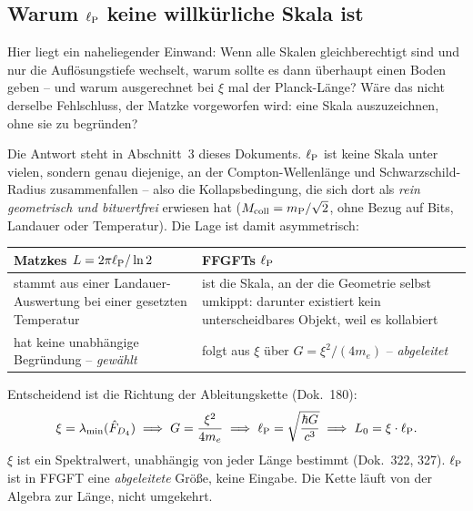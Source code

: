 \subsection{Warum $\ell_{\mathrm{P}}$ keine willkürliche Skala ist}

Hier liegt ein naheliegender Einwand: Wenn alle Skalen gleichberechtigt
sind und nur die Auflösungstiefe wechselt, warum sollte es dann überhaupt
einen Boden geben -- und warum ausgerechnet bei $\xi$ mal der
Planck-Länge? Wäre das nicht derselbe Fehlschluss, der Matzke
vorgeworfen wird: eine Skala auszuzeichnen, ohne sie zu begründen?

Die Antwort steht in Abschnitt~3 dieses Dokuments. $\ell_{\mathrm{P}}$ ist keine Skala
unter vielen, sondern genau diejenige, an der Compton-Wellenlänge und
Schwarzschild-Radius zusammenfallen -- also die Kollapsbedingung, die
sich dort als \emph{rein geometrisch und bitwertfrei} erwiesen hat
($M_{\mathrm{coll}} = m_{\mathrm{P}}/\sqrt{2}$, ohne Bezug auf Bits, Landauer oder Temperatur).
Die Lage ist damit asymmetrisch:

\begin{center}
\small
\begin{tabular}{@{}p{5.2cm}p{8.3cm}@{}}
  \toprule
  \textbf{Matzkes} $L = 2\pi\ell_{\mathrm{P}}/\ln 2$ & \textbf{FFGFTs} $\ell_{\mathrm{P}}$ \\
  \midrule
  stammt aus einer Landauer-Auswertung bei einer gesetzten Temperatur &
  ist die Skala, an der die Geometrie selbst umkippt: darunter existiert
  kein unterscheidbares Objekt, weil es kollabiert \\[3pt]
  hat keine unabhängige Begründung -- \emph{gewählt} &
  folgt aus $\xi$ über $G = \xi^2/(4m_e)$ -- \emph{abgeleitet} \\
  \bottomrule
\end{tabular}
\end{center}

Entscheidend ist die Richtung der Ableitungskette (Dok.~180):
\begin{equation}
  \xi = \lambda_{\min}(\hat F_{D_4})
  \;\Longrightarrow\; G = \frac{\xi^2}{4m_e}
  \;\Longrightarrow\; \ell_{\mathrm{P}} = \sqrt{\frac{\hbar G}{c^3}}
  \;\Longrightarrow\; L_0 = \xi\cdot\ell_{\mathrm{P}} .
\end{equation}
$\xi$ ist ein Spektralwert, unabhängig von jeder Länge bestimmt
(Dok.~322, 327). $\ell_{\mathrm{P}}$ ist in FFGFT eine \emph{abgeleitete} Größe, keine
Eingabe. Die Kette läuft von der Algebra zur Länge, nicht umgekehrt.


